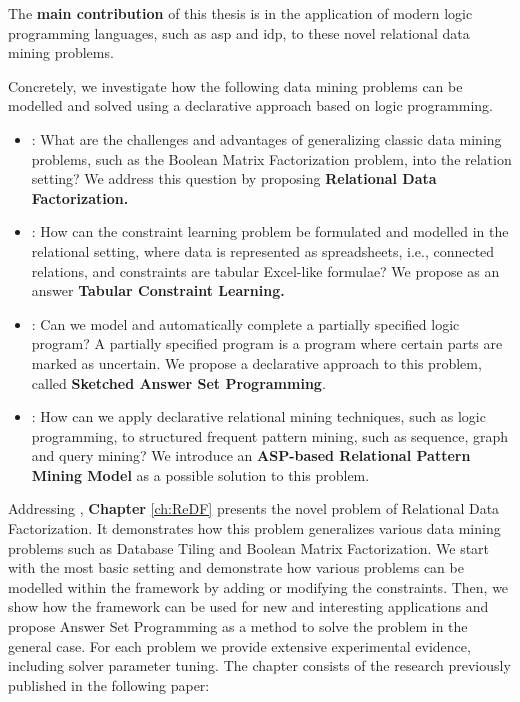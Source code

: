 The \textbf{main contribution} of this thesis is in the application of
modern logic programming languages, such as \acrshort{asp} and
\acrshort{idp}, to these novel relational data mining problems.


Concretely, we investigate how the following data mining problems
can be modelled and solved using a declarative approach based on
logic programming.
\pubrev
\begin{itemize}
    \item \cone: What are the challenges and advantages of generalizing
    classic data mining problems, such as the Boolean Matrix
    Factorization problem, into the relation setting? We address this
        question by proposing \textbf{Relational Data Factorization.}
  \item \ctwo: How can the constraint learning problem be formulated
   and modelled in the relational setting, where data is
   represented as spreadsheets, i.e., connected relations, and constraints are
   tabular Excel-like formulae? We propose as an answer \textbf{Tabular Constraint Learning.} 
  \item \cthree: Can we model and automatically complete a partially specified logic program?
      A partially specified program is a program where certain
        parts are marked as uncertain. We propose a declarative approach to
        this problem, called \textbf{Sketched Answer Set Programming}.
   \item \cfour:
    How can we apply declarative relational mining
    techniques, such as logic programming, to structured frequent pattern mining, such as sequence, graph
    and query mining? We introduce an \textbf{ASP-based Relational
        Pattern Mining Model} as a possible solution to this problem.
\end{itemize}
\pubrevend

Addressing \cone, \textbf{Chapter} \ref{ch:ReDF} presents the novel problem of Relational Data
Factorization. It demonstrates how this problem generalizes various
data mining problems such as Database Tiling and Boolean Matrix
Factorization. We start with the most basic setting and demonstrate
how various problems can be modelled within the framework by adding
or modifying the constraints. Then, we show how the framework can be
used for new and interesting applications and propose Answer Set
Programming as a method to solve the problem in the general case.
For each problem we provide extensive experimental evidence,
including solver parameter tuning. The chapter consists of the
research previously published in the following paper:

